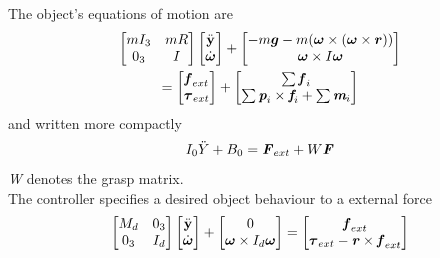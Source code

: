 \documentclass[conference]{IEEEtran}
\begin{document}
The object's equations of motion are 
\begin{multline}
\begin{bmatrix}mI_3 & mR \\0_3 & I\end{bmatrix}
\begin{bmatrix}\ddot{\textbf{y}}\\\dot{\boldsymbol{\omega}}\end{bmatrix} + 
\begin{bmatrix}-m\boldsymbol{g}-m(\boldsymbol{\omega} \times (\boldsymbol{\omega} \times \boldsymbol{r}))\\\boldsymbol{\omega} \times I \boldsymbol{\omega}\end{bmatrix}\\
=\begin{bmatrix}\textbf{\textit{f}}_{ext}\\\boldsymbol{\tau}_{ext}\end{bmatrix}+
\begin{bmatrix}\sum\textbf{\textit{f}}_i\\\sum\textit{\textbf{p}}_i \times \textit{\textbf{f}}_i + \sum\textit{\textbf{m}}_i\end{bmatrix}
\end{multline}
and written more compactly
\begin{equation}\label{actualobjectimpedance}
I_0\ddot{Y}+B_0 = \textbf{\textit{F}}_{ext}+W\textbf{\textit{F}}
\end{equation}
\textit{W} denotes the grasp matrix. \\
The controller specifies a desired object behaviour to a external force
\begin{equation}
\begin{bmatrix}M_d & 0_3 \\0_3 & I_d\end{bmatrix}
\begin{bmatrix}\ddot{\textbf{y}}\\\dot{\boldsymbol{\omega}}\end{bmatrix} + 
\begin{bmatrix}0\\\boldsymbol{\omega} \times I_d \boldsymbol{\omega}\end{bmatrix}
=\begin{bmatrix}\textbf{\textit{f}}_{ext}\\\boldsymbol{\tau}_{ext}-\textbf{\textit{r}}\times\textbf{\textit{f}}_{ext}\end{bmatrix}
\end{equation}
\end{document}
